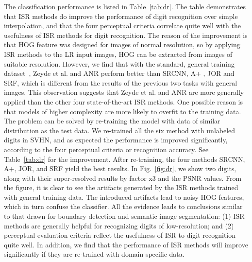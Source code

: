 The classification performance is listed in Table~\ref{tab:dr}. The table demonstrates that ISR methods do improve the
performance of digit recognition over simple interpolation, and that
the four perceptual criteria correlate quite well with the usefulness
of ISR methods for digit recognition. The reason of the improvement is
that HOG feature was designed for images of normal resolution, so by
applying ISR methods to the LR input images, HOG can be extracted from
images of suitable resolution.  However, we find that with the
standard, general training dataset~\cite{Yang-TIP-2010}, Zeyde et
al. and ANR perform better than SRCNN, A+ , JOR and SRF, which is different
from the results of the previous two tasks with general images. This observation
suggests that Zeyde et al. and ANR are more generally applied than the
other four state-of-the-art ISR methods. One possible reason is that models 
of higher complexity are more likely to overfit to the training data. 
The problem can be solved by
re-training the model with data of similar distribution as the test data. We re-trained
all the six method with unlabeled digits in SVHN, and as expected the
performance is improved significantly, according to the four perceptual criteria or 
recognition accuracy. See Table~\ref{tab:dr} for the improvement. After re-training, 
the four methods SRCNN, A+, JOR, and SRF yield the best results.  
 In Fig.~\ref{fig:dr}, we show
two digits, along with their super-resolved results by factor x3
and the PSNR values. From the figure, it is clear to see the artifacts
generated by the ISR methods trained with general training data. The
introduced artifacts lead to noisy HOG features, which in turn confuse
the classifier. All the evidence leads to conclusions similar to that
drawn for boundary detection and semantic image segmentation: (1) ISR methods are
generally helpful for recognizing digits of low-resolution; and (2)
perceptual evaluation criteria reflect the usefulness of ISR
to digit recognition quite well.  In addition, we find that the performance of
ISR methods will improve significantly if they are re-trained with domain specific
data.


